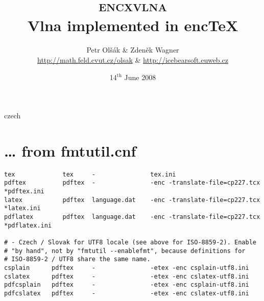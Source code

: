 \documentclass[12pt,a4paper]{article}
\def\sup#1{\ensuremath{^\mathrm{#1}}}
\newif\ifeng
\begin{document}
\title{\textsc{encxvlna}\\Vlna implemented in enc\TeX}
\author{Petr Olšák \& Zdeněk Wagner\\\url{http://math.feld.cvut.cz/olsak} \&
\url{http://icebearsoft.euweb.cz}}
\date{14\sup{th} June 2008}
\maketitle
\def\contentsname{Contents\,/\,Obsah}
\tableofcontents

\engtrue

\clearpage

\begin{otherlanguage*}{czech}
\engfalse
\end{otherlanguage*}

\section{\texorpdfstring{\ldots}{...} from fmtutil.cnf}\label{fmtutil}
\begingroup\footnotesize
\begin{verbatim}
tex             tex     -               tex.ini
pdftex          pdftex  -               -enc -translate-file=cp227.tcx *pdftex.ini
latex           pdftex  language.dat    -enc -translate-file=cp227.tcx *latex.ini
pdflatex        pdftex  language.dat    -enc -translate-file=cp227.tcx *pdflatex.ini

# - Czech / Slovak for UTF8 locale (see above for ISO-8859-2). Enable
# "by hand", not by "fmtutil --enablefmt", because definitions for
# ISO-8859-2 / UTF8 share the same name.
csplain      pdftex     -               -etex -enc csplain-utf8.ini
cslatex      pdftex     -               -etex -enc cslatex-utf8.ini
pdfcsplain   pdftex     -               -etex -enc csplain-utf8.ini
pdfcslatex   pdftex     -               -etex -enc cslatex-utf8.ini
\end{verbatim}
\endgroup
\end{document}

